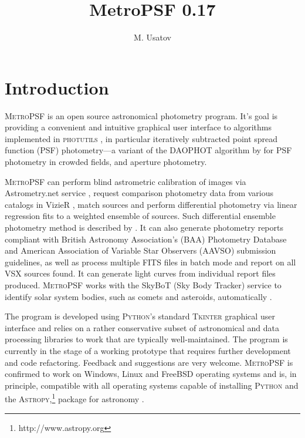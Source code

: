 \documentclass{article}
\begin{document}
\title{MetroPSF 0.17}
\author{M. Usatov}

\maketitle

\tableofcontents

\section{Introduction} \label{intro}
\textsc{MetroPSF} is an open source astronomical photometry program. It's goal is providing a convenient and intuitive graphical user interface to algorithms implemented in \textsc{photutils} \citep{larry_bradley_2020_4044744}, in particular iteratively subtracted point spread function (PSF) photometry---a variant of the \textsc{DAOPHOT} algorithm by \citet{1987PASP...99..191S} for PSF photometry in crowded fields, and aperture photometry. 

\textsc{MetroPSF} can perform blind astrometric calibration of images via Astrometry.net service \citep{2010AJ....139.1782L}, request comparison photometry data from various catalogs in VizieR \citep{2000A&AS..143...23O}, match sources and perform differential photometry via linear regression fits to a weighted ensemble of sources. Such differential ensemble photometry method is described by \citet{2010JAVSO..38..202P}. It can also generate photometry reports compliant with British Astronomy Association's (BAA) Photometry Database and American Association of Variable Star Observers (AAVSO) submission guidelines, as well as process multiple FITS files in batch mode and report on all VSX sources found. It can generate light curves from individual report files produced. \textsc{MetroPSF} works with the SkyBoT (Sky Body Tracker) service to identify solar system bodies, such as comets and asteroids, automatically \citep{2006ASPC..351..367B}. 

The program is developed using \textsc{Python}'s standard \textsc{Tkinter} graphical user interface and relies on a rather conservative subset of astronomical and data processing libraries to work that are typically well-maintained. The program is currently in the stage of a working prototype that requires further development and code refactoring. Feedback and suggestions are very welcome. \textsc{MetroPSF} is confirmed to work on Windows, Linux and FreeBSD operating systems and is, in principle, compatible with all operating systems capable of installing \textsc{Python} and the \textsc{Astropy},\footnote{http://www.astropy.org} package for astronomy \citep{astropy:2013, astropy:2018}. 
\end{document}

